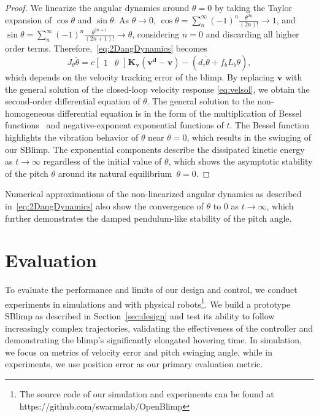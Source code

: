 \documentclass[conference]{ieeeconf}
\begin{document}
\begin{proof}
We linearize the angular dynamics around $\theta = 0$ by taking the Taylor expansion of $\cos{\theta}$ and $\sin{\theta}$. As $\theta\rightarrow0$, $\cos{\theta} = \sum_n^\infty(-1)^n\frac{\theta^{2n}}{(2n)!}\rightarrow1$, and $\sin{\theta} = \sum_n^\infty(-1)^n\frac{\theta^{2n + 1}}{(2n + 1)!}\rightarrow\theta$, considering $n = 0$ and discarding all higher order terms. Therefore,~\eqref{eq:2DangDynamics} becomes\begin{equation}
    J_\theta\ddot{\theta} = 
    c\begin{bmatrix}
        1 & \theta
    \end{bmatrix} \boldsymbol{K_{v}}\left(\boldsymbol{v^d - v}\right)
    - (d_\tau\dot{\theta}+f_bL_b\theta),
    \label{eq:2DangDynamicsLinear}
\end{equation}
which depends on the velocity tracking error of the blimp. By replacing $\boldsymbol{v}$ with the general solution of the closed-loop velocity response \eqref{eq:velsol}, we obtain the second-order differential equation of $\theta$. The general solution to the non-homogeneous differential equation is in the form of the multiplication of Bessel functions~\cite{abramowitz1964handbook} and negative-exponent exponential functions of $t$. The Bessel function highlights the vibration behavior of $\theta$ near $\theta = 0$, which results in the swinging of our SBlimp. The exponential components describe the dissipated kinetic energy as $t\rightarrow\infty$ regardless of the initial value of $\theta$, which shows the asymptotic stability of the pitch $\theta$ around its natural equilibrium~$\theta=0$.
\end{proof}

Numerical approximations of the non-linearized angular dynamics as described in~\eqref{eq:2DangDynamics} also show the convergence of $\theta$ to $0$ as $t\rightarrow\infty$, which further demonstrates the damped pendulum-like stability of the pitch angle.

\section{Evaluation}
To evaluate the performance and limits of our design and control, we conduct experiments in simulations and with physical robots\footnote{The source code of our simulation and experiments can be found at https://github.com/swarmslab/OpenBlimp}.
We build a prototype SBlimp as described in Section~\ref{sec:design} and test its ability to follow increasingly complex trajectories, validating the effectiveness of the controller and demonstrating the blimp's significantly elongated hovering time. In simulation, we focus on metrics of velocity error and pitch swinging angle, while in experiments, we use position error as our primary evaluation metric.
\end{document}
